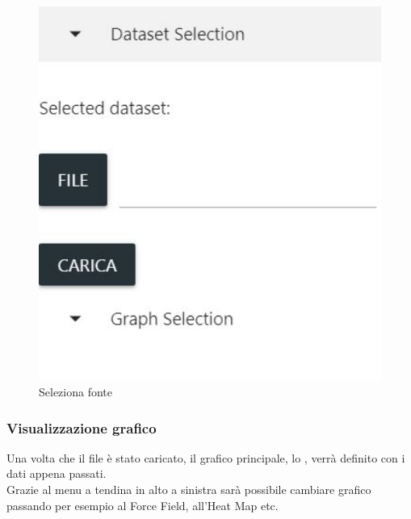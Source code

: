\documentclass[../manuale_utente.tex]{subfiles}
\begin{document}
\begin{figure}[H]
	\centering
	\includegraphics[width=18cm]{src/img/seleziona_dataset.jpg}
	\caption{Seleziona fonte}
\end{figure}

\subsubsection{Visualizzazione grafico}
    \label{subsub:vis_graf}
Una volta che il file è stato caricato, il grafico principale, lo , verrà definito con i dati appena passati. \\
Grazie al menu a tendina in alto a sinistra sarà possibile cambiare grafico passando per esempio al Force Field, all’Heat Map etc.
\end{document}
